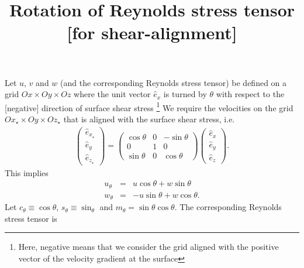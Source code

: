 \documentclass[a4paper,12pt]{article}
\title{Rotation of Reynolds stress tensor [for shear-alignment]}
\begin{document}
 
Let $u$, $v$ and $w$ (and the corresponding Reynolds stress tensor) 
be defined on a grid $Ox \times Oy \times Oz$ where the unit vector 
$\hat{e}_x$ is turned by $\theta$ with respect to the [negative] 
direction of surface shear stress \footnote{Here, negative means that we 
consider the grid aligned with the positive vector of the velocity gradient 
at the surface}
We require the velocities on the grid $Ox_\star \times Oy \times Oz_\star$ 
that is aligned with the surface shear stress, i.e. 
\begin{eqnarray}  
  \left(\begin{array}{c}
    \hat{e}_{x_\star}\\
    \hat{e}_y\\
    \hat{e}_{z_\star}
  \end{array} \right) = \left(\begin{array}{ccc}
    \cos\theta& 0 &-\sin\theta \\ 
    0 & 1 & 0 \\
    \sin\theta & 0 & \cos\theta 
  \end{array} \right)\left(\begin{array}{c} 
    \hat{e}_x \\ \hat{e}_y \\ \hat{e}_z
   \end{array}\right). 
\end{eqnarray} 
This implies 
\begin{eqnarray*} 
  u_\theta&=&u\cos\theta  +w\sin\theta \\ 
  w_\theta&=&-u\sin\theta +w\cos\theta. 
\end{eqnarray*}  
Let $c_\theta\equiv \cos\theta$, $s_\theta\equiv \sin_\theta$ and $m_\theta=\sin\theta\cos\theta$.
The corresponding Reynolds stress tensor is 
\end{document}
